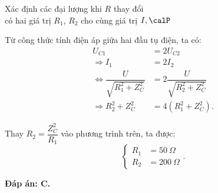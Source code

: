 \begin{dang}{Xác định các đại lượng khi $R$ thay đổi\\ có hai giá trị $R_1$, $R_2$ cho cùng giá trị $I, \calP$}
{		Từ công thức tính điện áp giữa hai đầu tụ điện, ta có:
		\begin{align*}
			U_{C1}&=2U_{C2} \\
			\Rightarrow I_1 &= 2 I_2 \\
			\Leftrightarrow \dfrac{U}{\sqrt{R_1^2 + Z_C^2}}&=2\dfrac{U}{\sqrt{R_2^2+Z_C^2}}\\
			\Rightarrow R_2^2+Z_C^2&=4(R_1^2+Z_C^2).
		\end{align*}
		
		Thay $R_2=\dfrac{Z_C^2}{R_1}$ vào phương trình trên, ta được:
		\begin{equation*}\begin{cases}
				R_1&= \SI{50}{\Omega}\\
				R_2&= \SI{200}{\Omega}
			\end{cases}.\end{equation*}	
		
		\textbf{Đáp án: C.}
	}
\end{dang}
